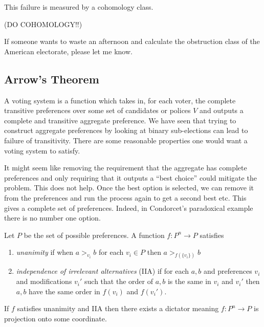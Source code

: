 \documentclass[12pt]{article}
\begin{document}
This failure is measured by a cohomology class. 

(DO COHOMOLOGY!!)

If someone wants to waste an afternoon and calculate the obstruction class of the American electorate, please let me know. 

\subsection{Arrow's Theorem}

A voting system is a function which takes in, for each voter, the complete transitive preferences over some set of candidates or polices $V$ and outputs a complete and transitive aggregate preference. We have seen that trying to construct aggregate preferences by looking at binary sub-elections can lead to failure of transitivity.
There are some reasonable properties one would want a voting system to satisfy.

\begin{rmk}
It might seem like removing the requirement that the aggregate has complete preferences and only requiring that it outputs a ``best choice'' could mitigate the problem. This does not help. Once the best option is selected, we can remove it from the preferences and run the process again to get a second best etc. This gives a complete set of preferences. Indeed, in Condorcet's paradoxical example there is no number one option.
\end{rmk} 

\begin{defn}
Let $P$ be the set of possible preferences. A function $f : P^n \to P$ satisfies
\begin{enumerate}
\item \textit{unanimity} if when $a >_{v_i} b$ for each $v_i \in P$ then $a >_{f(\{v_i\})} b$ 
\item \textit{independence of irrelevant alternatives} (IIA) if for each $a,b$ and preferences $v_i$ and modifications $v_i'$ such that the order of $a,b$ is the same in $v_i$ and $v_i'$ then $a,b$ have the same order in $f(v_i)$ and $f(v_i')$. 
\end{enumerate}
\end{defn}

\begin{theorem}[Arrow]
If $f$ satisfies unanimity and IIA then there exists a dictator meaning $f : P^n \to P$ is projection onto some coordinate. 
\end{theorem}
\end{document}
